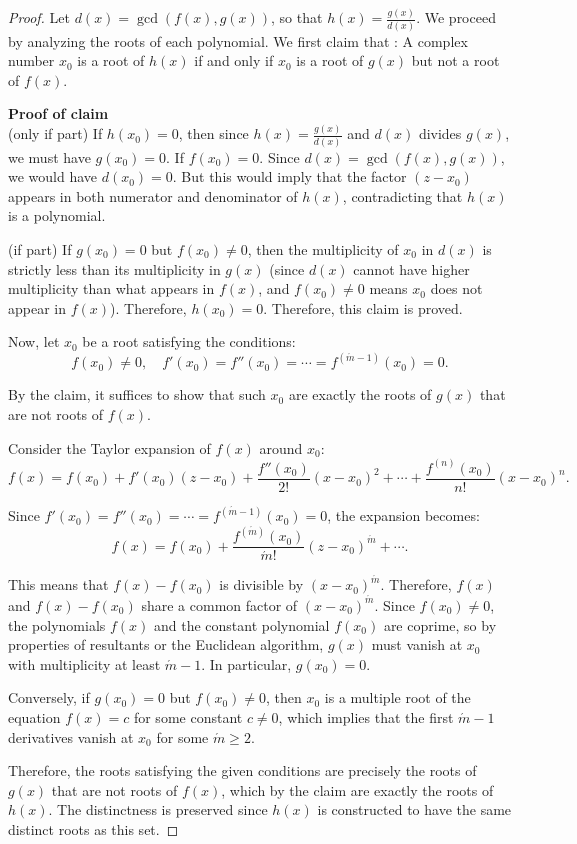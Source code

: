 \documentclass[11pt]{article}
\begin{document}
\begin{proof}

Let \( d(x) = \gcd(f(x), g(x)) \), so that \( h(x) = \frac{g(x)}{d(x)} \). We proceed by analyzing the roots of each polynomial. We first claim that : A complex number \( x_0 \) is a root of \( h(x) \) if and only if \( x_0 \) is a root of \( g(x) \) but not a root of \( f(x) \).

\textbf{Proof of claim}\\
(only if part) If \( h(x_0) = 0 \), then since \( h(x) = \frac{g(x)}{d(x)} \) and \( d(x) \) divides \( g(x) \), we must have \( g(x_0) = 0 \). If \( f(x_0) = 0 \).  Since \( d(x) = \gcd(f(x), g(x)) \), we would have \( d(x_0) = 0 \). But this would imply that the factor \( (z - x_0) \) appears in both numerator and denominator of \( h(x) \), contradicting that \( h(x) \) is a polynomial. 

(if part) If \( g(x_0) = 0 \) but \( f(x_0) \neq 0 \), then the multiplicity of \( x_0 \) in \( d(x) \) is strictly less than its multiplicity in \( g(x) \) (since \( d(x) \) cannot have higher multiplicity than what appears in \( f(x) \), and \( f(x_0) \neq 0 \) means \( x_0 \) does not appear in \( f(x) \)). Therefore, \( h(x_0) = 0 \). Therefore, this claim is proved.  

Now, let \( x_0 \) be a root satisfying the conditions:
\[
f(x_0) \neq 0, \quad f'(x_0) = f''(x_0) = \cdots = f^{(\acute{m}-1)}(x_0) = 0.
\]

By the claim, it suffices to show that such \( x_0 \) are exactly the roots of \( g(x) \) that are not roots of \( f(x) \).

Consider the Taylor expansion of \( f(x) \) around \( x_0 \):
\[
f(x) = f(x_0) + f'(x_0)(z - x_0) + \frac{f''(x_0)}{2!}(x - x_0)^2 + \cdots + \frac{f^{(n)}(x_0)}{n!}(x - x_0)^n.
\]

Since \( f'(x_0) = f''(x_0) = \cdots = f^{(\acute{m}-1)}(x_0) = 0 \), the expansion becomes:
\[
f(x) = f(x_0) + \frac{f^{(\acute{m})}(x_0)}{\acute{m}!}(z - x_0)^{\acute{m}} + \cdots.
\]

This means that \( f(x) - f(x_0) \) is divisible by \( (x - x_0)^{\acute{m}} \). Therefore, \( f(x) \) and \( f(x) - f(x_0) \) share a common factor of \( (x - x_0)^{\acute{m}} \). Since \( f(x_0) \neq 0 \), the polynomials \( f(x) \) and the constant polynomial \( f(x_0) \) are coprime, so by properties of resultants or the Euclidean algorithm, \( g(x) \) must vanish at \( x_0 \) with multiplicity at least \( \acute{m}-1 \). In particular, \( g(x_0) = 0 \).

Conversely, if \( g(x_0) = 0 \) but \( f(x_0) \neq 0 \), then \( x_0 \) is a multiple root of the equation \( f(x) = c \) for some constant \( c \neq 0 \), which implies that the first \( \acute{m}-1 \) derivatives vanish at \( x_0 \) for some \( \acute{m} \geq 2 \).

Therefore, the roots satisfying the given conditions are precisely the roots of \( g(x) \) that are not roots of \( f(x) \), which by the claim are exactly the roots of \( h(x) \). The distinctness is preserved since \( h(x) \) is constructed to have the same distinct roots as this set.
%
\end{proof}
\end{document}

